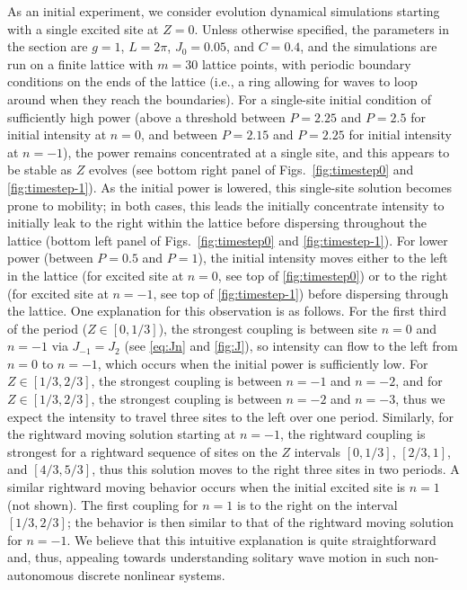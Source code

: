 \documentclass[reprint, amsmath,amssymb,aps,pre]{revtex4-2}
\begin{document}
As an initial experiment, we consider evolution dynamical
simulations starting with a single excited site at $Z=0$. Unless otherwise specified, the parameters in the section are $g=1$, $L=2\pi$, $J_0 = 0.05$, and $C=0.4$, and the simulations are run on a finite lattice with $m=30$ lattice points, with periodic boundary conditions on the ends of the lattice (i.e., a
ring allowing for waves to loop around when they reach the 
boundaries). For a single-site initial condition of sufficiently high power (above a threshold between $P=2.25$ and $P=2.5$ for 
initial intensity at $n=0$, and between $P=2.15$ and $P=2.25$ for initial intensity at $n=-1$), the power remains concentrated at a single site, and this appears to be stable as $Z$ evolves (see bottom right panel of Figs.~\ref{fig:timestep0} and \ref{fig:timestep-1}). As the initial power is lowered, this single-site solution becomes prone to mobility; in both cases, this leads the initially concentrate intensity to initially leak to the right within the lattice before dispersing throughout the lattice (bottom left panel of Figs.~\ref{fig:timestep0} and \ref{fig:timestep-1}). For lower power (between $P=0.5$ and $P=1$), the initial intensity moves either to the left in the lattice (for excited site at $n=0$, see top of \cref{fig:timestep0}) or to the right (for excited site at $n=-1$, see top of \cref{fig:timestep-1}) before dispersing
through the lattice. One explanation for this observation is as follows. For the first third of the period ($Z \in [0,1/3]$), the strongest coupling is between site $n=0$ and $n=-1$ via $J_{-1} = J_2$ (see \cref{eq:Jn} and \cref{fig:J}), so intensity can flow to the left from $n=0$ to $n=-1$, which occurs when the initial power is sufficiently low. For $Z \in [1/3,2/3]$, the strongest coupling is between $n=-1$ and $n=-2$, and for $Z \in [1/3,2/3]$, the strongest coupling is between $n=-2$ and $n=-3$, thus we expect the intensity to travel three sites to the left over one period. Similarly, for the rightward moving solution starting at $n=-1$, the rightward coupling is strongest for a rightward sequence of sites on the $Z$ intervals $[0,1/3]$, $[2/3,1]$, and $[4/3,5/3]$, thus this solution moves to the right three sites in two periods. A similar rightward moving behavior occurs when the initial excited site is $n=1$ (not shown). The first coupling for $n=1$ is to the right on the interval $[1/3, 2/3]$; the behavior is then similar to that of the rightward moving solution for $n=-1$. We believe that this
intuitive explanation is quite straightforward and, thus,
appealing towards understanding solitary wave motion in such
non-autonomous discrete nonlinear systems.
\end{document}
